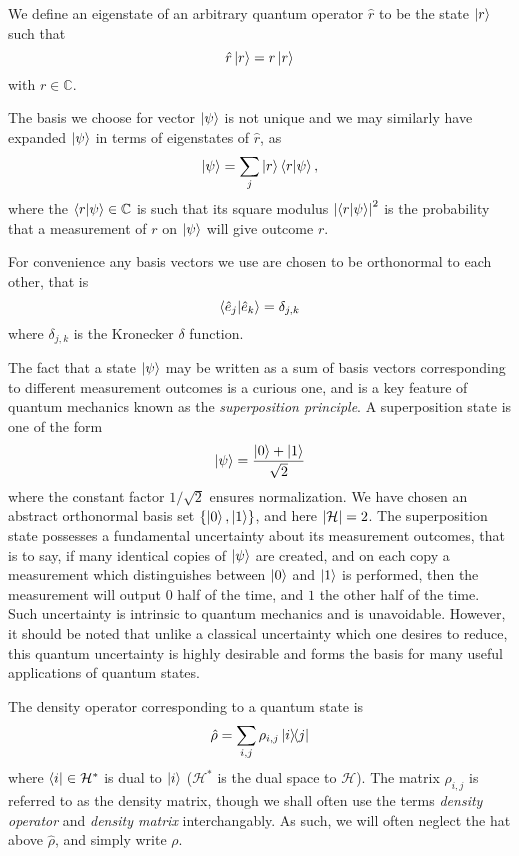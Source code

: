 \noindent We define an eigenstate of an arbitrary quantum operator $\hat{r}$ to be the state $\ket{r}$ such that
\begin{equation}
\hat{r} \ket{r} = r \ket{r}
\end{equation}
with $r \in \mathbb{C}$.

The basis we choose for vector $\ket{\psi}$ is not unique and we may similarly have expanded $\ket{\psi}$ in terms of eigenstates of $\hat{r}$, as
\begin{equation}
\ket{\psi} = \sum_j \ket{r}\ip{r}{\psi},
\end{equation}
where the $\ip{r}{\psi} \in \mathbb{C}$ is such that its square modulus $\left|\ip{r}{\psi}\right|^2$ is the probability that a measurement of $r$ on $\ket{\psi}$ will give outcome $r$.

For convenience any basis vectors we use are chosen to be orthonormal to each other, that is
\begin{equation}
\ip{\hat{e}_j}{\hat{e}_k} = \delta_{j, k}
\end{equation}
where $\delta_{j, k}$ is the Kronecker $\delta$ function.

The fact that a state $\ket{\psi}$ may be written as a sum of basis vectors corresponding to different measurement outcomes is a curious one, and is a key feature of quantum mechanics known as the \emph{superposition principle}. A superposition state is one of the form
\begin{equation}\label{eqn:intro_superposition}
\ket{\psi} = \frac{\ket{0} + \ket{1}}{\sqrt{2}}
\end{equation}
where the constant factor $1/\sqrt{2}$ ensures normalization. We have chosen an abstract orthonormal basis set $\left\{ \ket{0}, \ket{1}\right\}$, and here $\left|\mathcal{H}\right|=2$. The superposition state possesses a fundamental uncertainty about its measurement outcomes, that is to say, if many identical copies of $\ket{\psi}$ are created, and on each copy a measurement which distinguishes between $\ket{0}$ and $\ket{1}$ is performed, then the measurement will output $0$ half of the time, and $1$ the other half of the time. Such uncertainty is intrinsic to quantum mechanics and is unavoidable. However, it should be noted that unlike a classical uncertainty which one desires to reduce, this quantum uncertainty is highly desirable and forms the basis for many useful applications of quantum states.

The density operator corresponding to a quantum state is
\begin{equation}
\hat{\rho} = \sum_{i, j} \rho_{i, j} \dyad{i}{j}
\end{equation}
where $\bra{i} \in \mathcal{H}^*$ is dual to $\ket{i}$ ($\mathcal{H}^*$ is the dual space to $\mathcal{H}$). The matrix $\rho_{i, j}$ is referred to as the density matrix, though we shall often use the terms \emph{density operator} and \emph{density matrix} interchangably. As such, we will often neglect the hat above $\hat{\rho}$, and simply write $\rho$.


